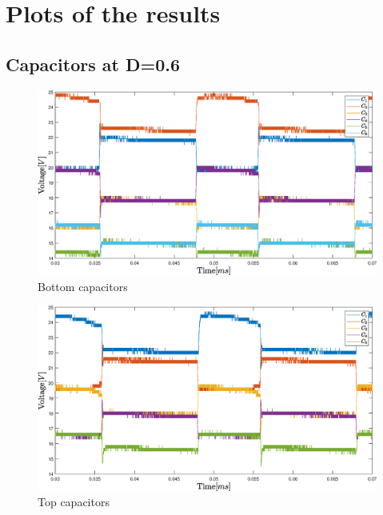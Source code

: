 \chapter{Plots of the results}
\label{app:Results}
\section{Capacitors at D=0.6}
\begin{figure}[H]
	\centering
	\includegraphics[width=\textwidth]{figures/06Testing/botcap60per.eps}
	\caption{Bottom capacitors}
\end{figure}
\vspace{10mm}
\begin{figure}[H]
	\centering
	\includegraphics[width=\textwidth]{figures/06Testing/topcap60per.eps}
	\caption{Top capacitors}
\end{figure}
